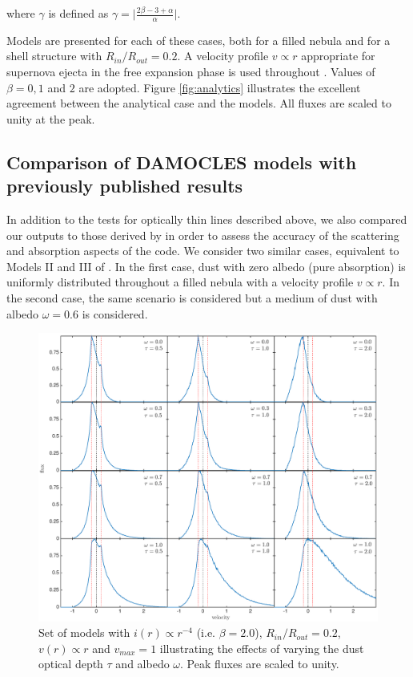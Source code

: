 \documentclass[useAMS,usenatbib,usegraphicx]{mnras}
\begin{document}
\noindent where $\gamma$ is defined as $\gamma= \lvert 
\frac{2\beta-3+\alpha}{\alpha} \rvert$.

Models are presented for each of these cases, both for a 
filled nebula and for a shell structure with $R_{in}/R_{out}=0.2$.  
A velocity profile $v \propto r$ appropriate for supernova ejecta in the free 
expansion phase is used throughout \citep{Li1992,Xu1992,McCray1996,Baron2005}.  Values of $\beta = 0, 1$ and $2$ are 
adopted.  Figure \ref{fig:analytics} illustrates the excellent agreement between 
the analytical case and the models.  All fluxes are scaled to unity at the peak.

\subsection{Comparison of DAMOCLES models with previously published results}
\label{opt_thick_testing}



In addition to the tests for optically thin lines described above, we also 
compared our outputs to those derived by \citet{Lucy1989} in order to 
assess the accuracy of the scattering and absorption aspects of the code.  
We consider two similar cases, equivalent to Models II and III of 
\citet{Lucy1989}. In the first case, dust with zero albedo (pure absorption) is 
uniformly distributed throughout a filled nebula with a velocity profile 
$v \propto r$.  In the second case, the same scenario is considered but a 
medium of dust with albedo $\omega =0.6$ is considered.

\begin{figure}
\includegraphics[trim =80 10 40 15,clip=true,scale=0.515]{params/C/C_all} 
\caption{Set of models with $i(r) \propto r^{-4}$ (i.e. $\beta=2.0$), $R_{in}/R_{out}=0.2$, $v(r) \propto r$  
and $v_{max}=1$ illustrating the effects of varying the dust optical depth $\tau$ and albedo $\omega$. 
Peak fluxes are scaled to unity.}
\label{wt}
\end{figure}
\end{document}

